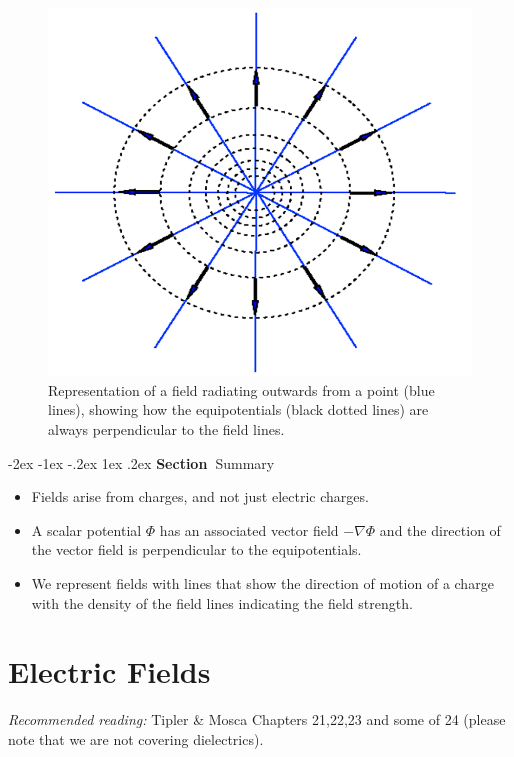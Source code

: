 \documentclass[
]{book}
\makeatletter
\renewcommand\section{%
\@startsection{section}{1}{\z@}%
              {-2ex \@plus -1ex \@minus -.2ex}%
              {1ex \@plus .2ex}%
              {\sffamily\bfseries\large\noindent Section~}}
\numberwithin{equation}{section}
\makeatother
\begin{document}
\begin{figure}

{\centering \includegraphics[width=0.7\linewidth]{Figures/equipotentials} 

}

\caption{Representation of a field radiating outwards from a point (blue lines), showing how the equipotentials (black dotted lines) are always perpendicular to the field lines.}\label{fig:equipotentials}
\end{figure}

\hypertarget{summary}{%
\section{Summary}\label{summary}}

\begin{itemize}
\item
  Fields arise from charges, and not just electric charges.
\item
  A scalar potential \(\Phi\) has an associated vector field
  \(-\nabla \Phi\) and the direction of the vector field is
  perpendicular to the equipotentials.
\item
  We represent fields with lines that show the direction of motion of
  a charge with the density of the field lines indicating the field
  strength.
\end{itemize}

\hypertarget{electric-fields}{%
\chapter{Electric Fields}\label{electric-fields}}

\emph{Recommended reading:} Tipler \& Mosca Chapters 21,22,23 and some of 24
(please note that we are not covering dielectrics).
\end{document}
